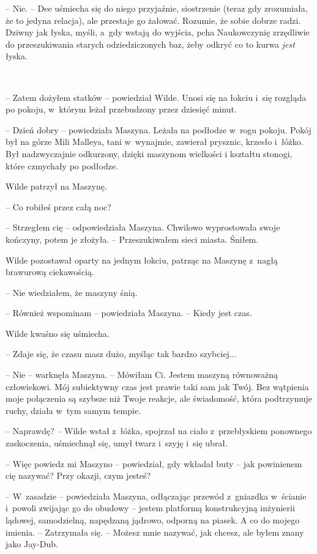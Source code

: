 \documentclass[oneside,polish,11pt,sfheadings]{mwbk}
\begin{document}
-- Nie. -- Dee uśmiecha się do niego przyjaźnie, siostrzenie (teraz gdy
zrozumiała, że to jedyna relacja), ale przestaje go żałować. Rozumie, że
sobie dobrze radzi. Dziwny jak łyska, myśli, a~gdy wstają do wyjścia,
pcha Naukowczynię zrzędliwie do przeszukiwania starych odziedziczonych
baz, żeby odkryć co to kurwa \emph{jest }łyska.

~

-- Zatem dożyłem statków -- powiedział Wilde. Unosi się na łokciu i~się
rozgląda po pokoju, w~którym leżał przebudzony przez dziesięć minut.

-- Dzień dobry -- powiedziała Maszyna. Leżała na podłodze w~rogu pokoju.
Pokój był na górze Mili Malleya, tani w~wynajmie, zawierał prysznic,
krzesło i~łóżko. Był nadzwyczajnie odkurzony, dzięki maszynom wielkości
i kształtu stonogi, które czmychały po podłodze.

Wilde patrzył na Maszynę. 

-- Co robiłeś przez całą noc?

-- Strzegłem cię -- odpowiedziała Maszyna. Chwilowo wyprostowała swoje
kończyny, potem je złożyła. -- Przeszukiwałem sieci miasta. Śniłem.

Wilde pozostawał oparty na jednym łokciu, patrząc na Maszynę z~nagłą
brawurową ciekawością. 

-- Nie wiedziałem, że maszyny śnią.

-- Również wspominam -- powiedziała Maszyna. -- Kiedy jest czas.

Wilde kwaśno się uśmiecha. 

-- Zdaje się, że czasu masz dużo, myśląc tak
bardzo szybciej...

-- Nie -- warknęła Maszyna. -- Mówiłam Ci. Jestem maszyną równoważną
człowiekowi. Mój subiektywny czas jest prawie taki sam jak Twój. Bez
wątpienia moje połączenia są szybsze niż Twoje reakcje, ale świadomość,
która podtrzymuje ruchy, działa w~tym samym tempie.

-- Naprawdę? -- Wilde wstał z~łóżka, spojrzał na ciało z~przebłyskiem
ponownego zaskoczenia, uśmiechnął się, umył twarz i~szyję i~się ubrał.

-- Więc powiedz mi Maszyno -- powiedział, gdy wkładał buty -- jak
powinienem cię nazywać? Przy okazji, czym jesteś?

-- W~zasadzie -- powiedziała Maszyna, odłączając przewód z~gniazdka w~ścianie i~powoli zwijając go do obudowy -- jestem platformą konstrukcyjną
inżynierii lądowej, samodzielną, napędzaną jądrowo, odporną na piasek. A
co do mojego imienia. -- Zatrzymała się. -- Możesz mnie nazywać, jak
chcesz, ale byłem znany jako Jay-Dub.
\end{document}
